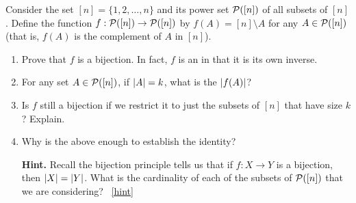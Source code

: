 \documentclass{book}
\begin{document}
\setcounter{project}{75}
\addtocounter{project}{-1}
\begin{activity}[]\label{act-pascalsym-bij}
\hypertarget{p-592}{}%
Consider the set \([n] = \{1,2,\ldots,n\}\) and its power set \(\mathcal P([n])\) of all subsets of \([n]\).  Define the function \(f:\mathcal P([n]) \to \mathcal P([n])\) by \(f(A) = [n]\setminus A\) for any \(A \in \mathcal P([n])\) (that is, \(f(A)\) is the complement of \(A\) in \([n]\)).%
\begin{enumerate}[font=\bfseries,label=(\alph*),ref=\alph*]
\item\label{task-108} \hypertarget{p-593}{}%
Prove that \(f\) is a bijection.  In fact, \(f\) is an  in that it is its own inverse.%
\item\label{task-109} \hypertarget{p-594}{}%
For any set \(A \in \mathcal P([n])\), if \(\left| A \right| = k\), what is the \(\left| f(A) \right|\)?%
\item\label{task-110} \hypertarget{p-595}{}%
Is \(f\) still a bijection if we restrict it to just the subsets of \([n]\) that have size \(k\)?  Explain.%
\item\label{task-111} \hypertarget{p-596}{}%
Why is the above enough to establish the identity?%
\par\smallskip%
\noindent\textbf{Hint.}\hypertarget{hint-31}{}\quad%
\hypertarget{p-597}{}%
Recall the bijection principle tells us that if \(f:X \to Y\) is a bijection, then \(\left| X \right| = \left| Y \right|\).  What is the cardinality of each of the subsets of \(\mathcal P([n])\) that we are considering?%
~\hfill{\tiny\hyperlink{a-75.d}{[hint]}\hypertarget{q-75.d}{}}\end{enumerate}
\end{activity}
\end{document}
